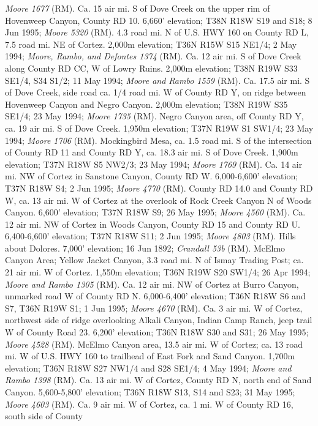 \textit{Moore 1677} (RM).
Ca. 15 air mi. S of Dove Creek on the upper rim of Hovenweep Canyon,
County RD 10. 6,660' elevation; T38N R18W S19 and S18; 8 Jun 1995;
\textit{Moore 5320} (RM).
4.3 road mi. N of U.S. HWY 160 on County RD L, 7.5 road mi. NE of Cortez.
2,000m elevation; T36N R15W S15 NE1/4; 2 May 1994;
\textit{Moore, Rambo, and Defontes 1374} (RM).
Ca. 12 air mi. S of Dove Creek along County RD CC, W of Lowry Ruins.
2,000m elevation; T38N R19W S33 SE1/4, S34 S1/2; 11 May 1994;
\textit{Moore and Rambo 1559} (RM).
Ca. 17.5 air mi. S of Dove Creek, side road ca. 1/4 road mi. W of County RD Y,
on ridge between Hovenweep Canyon and Negro Canyon. 2,000m elevation;
T38N R19W S35 SE1/4; 23 May 1994; \textit{Moore 1735} (RM).
Negro Canyon area, off County RD Y, ca. 19 air mi. S of Dove Creek.
1,950m elevation; T37N R19W S1 SW1/4; 23 May 1994; \textit{Moore 1706} (RM).
Mockingbird Mesa, ca. 1.5 road mi. S of the intersection of County RD 11 and
County RD Y, ca. 18.3 air mi. S of Dove Creek. 1,900m elevation;
T37N R18W S5 NW2/3; 23 May 1994; \textit{Moore 1769} (RM).
Ca. 14 air mi. NW of Cortez in Sanstone Canyon, County RD W. 6,000-6,600'
elevation; T37N R18W S4; 2 Jun 1995; \textit{Moore 4770} (RM).
County RD 14.0 and County RD W, ca. 13 air mi. W of Cortez at the overlook
of Rock Creek Canyon N of Woods Canyon. 6,600' elevation; T37N R18W S9;
26 May 1995; \textit{Moore 4560} (RM).
Ca. 12 air mi. NW of Cortez in Woods Canyon, County RD 15 and County RD U.
6,400-6,600' elevation; T37N R18W S11; 2 Jun 1995; \textit{Moore 4803} (RM).
Hills about Dolores. 7,000' elevation; 16 Jun 1892; \textit{Crandall 53b} (RM).
McElmo Canyon Area; Yellow Jacket Canyon, 3.3 road mi. N of Ismay Trading Post;
ca. 21 air mi. W of Cortez. 1,550m elevation; T36N R19W S20 SW1/4; 26 Apr 1994;
\textit{Moore and Rambo 1305} (RM).
Ca. 12 air mi. NW of Cortez at Burro Canyon, unmarked road W of County RD N.
6,000-6,400' elevation; T36N R18W S6 and S7, T36N R19W S1; 1 Jun 1995;
\textit{Moore 4670} (RM).
Ca. 3 air mi. W of Cortez, northwest side of ridge overlooking Alkali Canyon,
Indian Camp Ranch, jeep trail W of County Road 23. 6,200' elevation;
T36N R18W S30 and S31; 26 May 1995; \textit{Moore 4528} (RM).
McElmo Canyon area, 13.5 air mi. W of Cortez; ca. 13 road mi. W of U.S. HWY 160
to trailhead of East Fork and Sand Canyon. 1,700m elevation; T36N R18W
S27 NW1/4 and S28 SE1/4; 4 May 1994; \textit{Moore and Rambo 1398} (RM).
Ca. 13 air mi. W of Cortez, County RD N, north end of Sand Canyon.
5,600-5,800' elevation; T36N R18W S13, S14 and S23; 31 May 1995;
\textit{Moore 4603} (RM).
Ca. 9 air mi. W of Cortez, ca. 1 mi. W of County RD 16, south side of County
